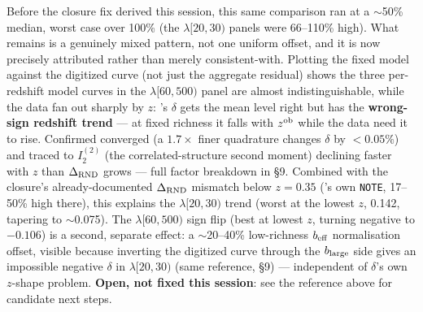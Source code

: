Before the closure fix derived this session, this same comparison ran at
a $\sim$50\% median, worst case over 100\% (the $\lambda[20,30)$ panels
were 66--110\% high). What remains is a genuinely mixed pattern, not one
uniform offset, and it is now precisely attributed rather than merely
consistent-with. Plotting the fixed model against the digitized curve
(not just the aggregate residual) shows the three per-redshift model
curves in the $\lambda[60,500)$ panel are almost indistinguishable, while
the data fan out sharply by $z$: 's $\delta$ gets
the mean level right but has the \textbf{wrong-sign redshift trend} ---
at fixed richness it falls with $z^{\rm ob}$ while the data need it to rise.
Confirmed converged (a $1.7\times$ finer quadrature changes $\delta$ by
$<0.05\%$) and traced to $I_2^{(2)}$ (the correlated-structure second
moment) declining faster with $z$ than $\Delta_{\rm RND}$ grows --- full factor
breakdown in  \S9. Combined with
the closure's already-documented $\Delta_{\rm RND}$ mismatch below $z=0.35$
('s own \texttt{NOTE}, 17--50\% high there), this
explains the $\lambda[20,30)$ trend (worst at the lowest $z$, 0.142,
tapering to $\sim$0.075). The $\lambda[60,500)$ sign flip (best at lowest
$z$, turning negative to $-0.106$) is a second, separate effect: a
$\sim$20--40\% low-richness $b_{\rm eff}$ normalisation offset, visible because
inverting the digitized curve through the $b_{\rm large}$ side gives an
impossible negative $\delta$ in $\lambda[20,30)$ (same reference, \S9)
--- independent of $\delta$'s own $z$-shape problem. \textbf{Open, not
fixed this session}: see the reference above for candidate next steps.
